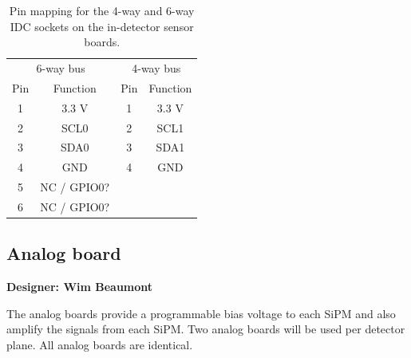 \documentclass[a4paper]{article}
\begin{document}
\begin{table}[h]
    \begin{center}
        \caption{Pin mapping for the 4-way and 6-way IDC sockets on the in-detector sensor boards.}
        \label{tab:indetectorpins}
        \begin{tabular}{cc|cc}
            \hline
            \hline
            \multicolumn{2}{c}{6-way bus} & \multicolumn{2}{c}{4-way bus}\\
            Pin & Function & Pin & Function \\
            \hline
            1 & 3.3 V & 1 & 3.3 V \\
            2 & SCL0 & 2 & SCL1 \\
            3 & SDA0 & 3 & SDA1 \\
            4 & GND & 4 & GND \\
            5 & NC / GPIO0? & & \\
            6 & NC / GPIO0? & & \\
            \hline
            \hline
        \end{tabular}
    \end{center}
\end{table}

\clearpage
\newpage
\subsection{Analog board}

{\bf Designer: Wim Beaumont}

The analog boards provide a programmable bias voltage to each SiPM and also amplify the signals from each SiPM.
Two analog boards will be used per detector plane.
All analog boards are identical.
\end{document}
